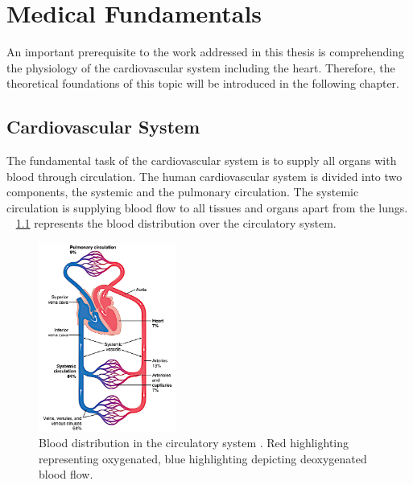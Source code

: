 \chapter{Medical Fundamentals}
 An important prerequisite to the work addressed in this thesis is comprehending the physiology of the cardiovascular system including the heart. Therefore, the theoretical foundations of this topic will be introduced in the following chapter.

\section{Cardiovascular System}
The fundamental task of the cardiovascular system is to supply all organs with blood through circulation. The human cardiovascular system is divided into two components, the systemic and the pulmonary circulation. The systemic circulation is supplying blood flow to all tissues and organs apart from the lungs. \figurename~ \ref{fig:circulation} represents the blood distribution over the circulatory system.  \cite{GH20}
\begin{figure}[ht]
  \centering
  \includegraphics[width=0.4\textwidth, height=0.6\textwidth]{images/chapt_2/circulation.jpg}
  \caption[Blood distribution in the ciculatory system \cite{GH20}]{Blood distribution in the circulatory system \cite{GH20}. Red highlighting representing oxygenated, blue highlighting depicting deoxygenated blood flow.}
  \label{fig:circulation}
\end{figure}
